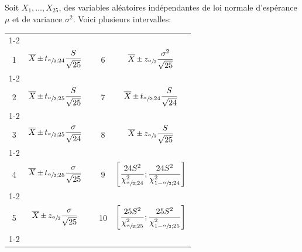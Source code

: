 \begin{questions}
\vspace{1cm}


\question Soit $X_1,\hdots, X_{25}$, des variables aléatoires indépendantes de loi normale d'espérance $\mu$ et de variance $\sigma^2$. Voici plusieurs intervalles:
\begin{center}
    
\begin{tabular}{|c|c|c|c|c|}
	\cline{1-2}\cline{4-5}
	&&&&\\[-3mm]
	1 &  $\displaystyle \overline {X}\Mypm t_{\sfrac{\alpha}{2};24}\frac{S}{\sqrt{25}}$
	 & \hspace{0.3cm} &
	 6 &  $\displaystyle \overline {X}\Mypm z_{\sfrac{\alpha}{2}}\frac{\sigma^2}{\sqrt{25}}$
	\\[4mm]
	\cline{1-2}\cline{4-5}
	&&&&\\[-3mm]
	 2 & $\displaystyle \overline {X}\Mypm t_{\sfrac{\alpha}{2};25}\frac{S}{\sqrt{25}}$
	&  &
	 7 & $\displaystyle \overline {X}\Mypm t_{\sfrac{\alpha}{2};24}\frac{S}{\sqrt{24}}$ 
	\\[4mm]
	\cline{1-2}\cline{4-5}
	&&&&\\[-3mm]
	 3 & $\displaystyle \overline {X}\Mypm t_{\sfrac{\alpha}{2};25}\frac{\sigma}{\sqrt{24}}$
	 &  &
	  8 & $\displaystyle \overline {X}\Mypm z_{\sfrac{\alpha}{2}}\frac{S}{\sqrt{25}}$
	 \\[4mm]
	 \cline{1-2}\cline{4-5}
	 &&&&\\[-3mm]
	   4 & $\displaystyle \overline {X}\Mypm t_{\sfrac{\alpha}{2};25}\frac{\sigma}{\sqrt{25}}$
	 &  &
	  9 & $\displaystyle \left[\frac{24S^2}{\chi_{\sfrac{\alpha}{2};24}^2};\frac{24S^2}{\chi_{1-\sfrac{\alpha}{2};24}^2}\right]$
	 \\[5mm]
	 \cline{1-2}\cline{4-5}
	 &&&&\\[-3mm]
	  5 & $\displaystyle \overline {X}\Mypm z_{\sfrac{\alpha}{2}}\frac{\sigma}{\sqrt{25}}$
	 &  &
	  10 & $\displaystyle \left[\frac{25S^2}{\chi_{\sfrac{\alpha}{2};25}^2};\frac{25S^2}{\chi_{1-\sfrac{\alpha}{2};25}^2}\right]$
	 \\[5mm]
	 \cline{1-2}\cline{4-5}


\end{tabular}
\end{center}
\end{questions}
